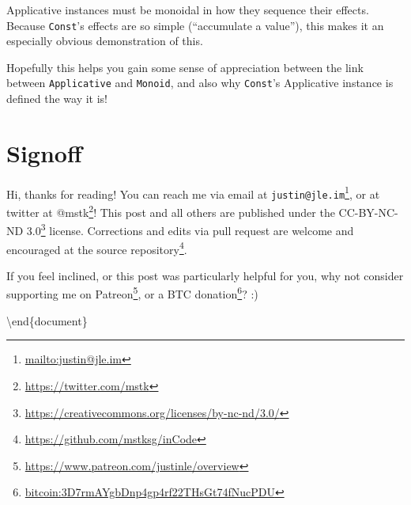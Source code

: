 \documentclass[]{article}
\renewcommand{\href}[2]{#2\footnote{\url{#1}}}
\begin{document}
Applicative instances must be monoidal in how they sequence their effects.
Because \texttt{Const}'s effects are so simple (``accumulate a value''), this
makes it an especially obvious demonstration of this.

Hopefully this helps you gain some sense of appreciation between the link
between \texttt{Applicative} and \texttt{Monoid}, and also why \texttt{Const}'s
Applicative instance is defined the way it is!

\section{Signoff}\label{signoff}

Hi, thanks for reading! You can reach me via email at
\href{mailto:justin@jle.im}{\nolinkurl{justin@jle.im}}, or at twitter at
\href{https://twitter.com/mstk}{@mstk}! This post and all others are published
under the \href{https://creativecommons.org/licenses/by-nc-nd/3.0/}{CC-BY-NC-ND
3.0} license. Corrections and edits via pull request are welcome and encouraged
at \href{https://github.com/mstksg/inCode}{the source repository}.

If you feel inclined, or this post was particularly helpful for you, why not
consider \href{https://www.patreon.com/justinle/overview}{supporting me on
Patreon}, or a \href{bitcoin:3D7rmAYgbDnp4gp4rf22THsGt74fNucPDU}{BTC donation}?
:)

\textbackslash end\{document\}
\end{document}

